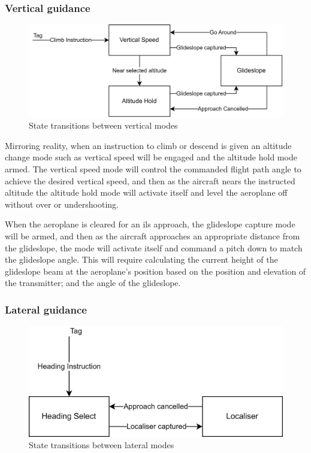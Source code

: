 \documentclass{article}
\begin{document}
\subsubsection{Vertical guidance}
\begin{figure}[H]
\centering
\includegraphics{diagrams/vertnav.png}
\caption{\label{fig:vertnav}State transitions between vertical modes}
\end{figure}
Mirroring reality, when an instruction to climb or descend is given an altitude change mode such as vertical speed will be engaged and the altitude hold mode armed.
The vertical speed mode will control the commanded flight path angle to achieve the desired vertical speed, and then as the aircraft nears the instructed altitude the altitude hold mode will activate itself and level the aeroplane off without over or undershooting.

When the aeroplane is cleared for an \acrshort{ils} approach, the glideslope capture mode will be armed, and then as the aircraft approaches an appropriate distance from the glideslope, the mode will activate itself and command a pitch down to match the glideslope angle.
This will require calculating the current height of the glideslope beam at the aeroplane's position based on the position and elevation of the transmitter; and the angle of the glideslope.

\subsubsection{Lateral guidance}
\begin{figure}[H]
\centering
\includegraphics{diagrams/lnav.png}
\caption{\label{fig:lnav}State transitions between lateral modes}
\end{figure}
\end{document}
